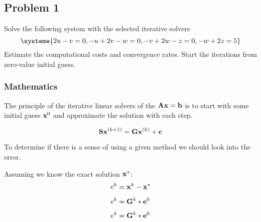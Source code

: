 \subsection{Problem 1}%
\label{sec:problem_1}
Solve the following system with the selected iterative solvers
\begin{equation*}
  \systeme{2u-v=0,-u+2v-w=0,-v+2w-z=0,-w+2z=5}
\end{equation*}
Estimate the computational costs and convergence rates.
Start the iterations from zero-value initial guess.
\subsubsection*{Mathematics}
The principle of the iterative linear solvers of the $\mathbf{A}\mathbf{x}=\mathbf{b}$ is to
start with some initial guess $\mathbf{x}^0$ and approximate the solution with each step.

\begin{equation*}
  \mathbf{S}\mathbf{}
  \mathbf{x}^{(k+1)} = \mathbf{G}\mathbf{x}^{(k)} + \mathbf{c}
\end{equation*}

To determine if there is a sense of using a given method we should look into the error.

Assuming we know the exact solution $\mathbf{x}^*$:
\begin{equation*}
  e^k = \mathbf{x}^k - \mathbf{x}^*
\end{equation*}

\begin{equation*}
  e^k = \mathbf{G}^k * \mathbf{e}^0
\end{equation*}


\begin{equation*}
  e^k = \mathbf{G}^k * \mathbf{e}^0
\end{equation*}


